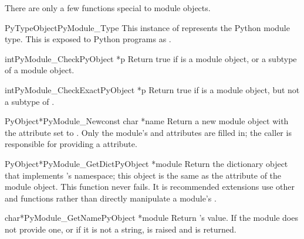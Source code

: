 There are only a few functions special to module objects.

\begin{cvardesc}{PyTypeObject}{PyModule_Type}
  This instance of  represents the Python module
  type.  This is exposed to Python programs as
  .
\end{cvardesc}

\begin{cfuncdesc}{int}{PyModule_Check}{PyObject *p}
  Return true if  is a module object, or a subtype of a module
  object.
\end{cfuncdesc}

\begin{cfuncdesc}{int}{PyModule_CheckExact}{PyObject *p}
  Return true if  is a module object, but not a subtype of
  .
\end{cfuncdesc}

\begin{cfuncdesc}{PyObject*}{PyModule_New}{const char *name}
  Return a new module object with the  attribute set
  to .  Only the module's  and
   attributes are filled in; the caller is
  responsible for providing a  attribute.
\end{cfuncdesc}

\begin{cfuncdesc}{PyObject*}{PyModule_GetDict}{PyObject *module}
  Return the dictionary object that implements 's
  namespace; this object is the same as the 
  attribute of the module object.  This function never fails.
  It is recommended extensions use other 
  and  functions rather than directly
  manipulate a module's .
\end{cfuncdesc}

\begin{cfuncdesc}{char*}{PyModule_GetName}{PyObject *module}
  Return 's  value.  If the module does
  not provide one, or if it is not a string, 
  is raised and \NULL{} is returned.
\end{cfuncdesc}

